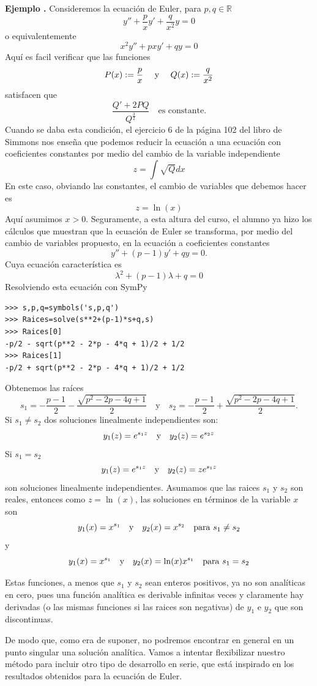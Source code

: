 \documentclass{article}
\newcommand{\rr}{\mathbb{R}}
\newcounter{ejemplo_cont}
\newenvironment{ejemplo}{\noindent\textbf{Ejemplo  \arabic{ejemplo_cont}.} }{\addtocounter{ejemplo_cont}{1}}
\begin{document}
\begin{ejemplo} Consideremos la ecuación de Euler, para $p,q\in\rr$
\[y''+\frac{p}{x}y'+\frac{q}{x^2}y=0\]
o equivalentemente
\[x^2y''+pxy'+qy=0\]
Aquí es facil verificar que las funciones
\[P(x):=\frac{p}{x}\quad\hbox{ y }\quad Q(x):= \frac{q}{x^2}\]
satisfacen que
\[\frac{Q'+2PQ}{Q^{\frac{3}{2}}}\quad\text{es constante.}\]
 Cuando se daba esta condición, el ejercicio 6 de la página 102 del libro de Simmons nos enseña que podemos reducir la ecuación a una ecuación con coeficientes constantes por medio del cambio de la variable independiente
\[z=\int\sqrt{Q}dx\]
En este caso, obviando las constantes, el cambio de variables que debemos hacer es
\[z=\ln(x)\]
Aquí  asumimos $x>0$. Seguramente, a esta altura del curso,  el alumno ya hizo los cálculos que muestran que la ecuación de Euler se transforma,  por medio del cambio de variables propuesto, en la ecuación a coeficientes constantes
\[y''+(p-1)y'+qy=0.\]
Cuya ecuación característica es
\[\lambda^2+(p-1)\lambda+q=0\]
Resolviendo esta ecuación con SymPy

\begin{lstlisting}
>>> s,p,q=symbols('s,p,q')
>>> Raices=solve(s**2+(p-1)*s+q,s)
>>> Raices[0]
-p/2 - sqrt(p**2 - 2*p - 4*q + 1)/2 + 1/2
>>> Raices[1]
-p/2 + sqrt(p**2 - 2*p - 4*q + 1)/2 + 1/2
\end{lstlisting}
Obtenemos las raíces 
\[s_1= -\frac{p-1}{2} - \frac{\sqrt{p^2 - 2p - 4q + 1}}{2}   \quad\text{y}\quad s_2=-\frac{p-1}{2} +\frac{\sqrt{p^2 - 2p - 4q + 1}}{2} .\]
 Si $s_1\neq s_2$ dos soluciones linealmente independientes son:
\[y_1(z)=e^{s_1z}\quad\hbox{y}\quad y_2(z)=e^{s_2z}\]
 Si $s_1=s_2$
\[y_1(z)=e^{s_1z} \quad\hbox{y}\quad y_2(z)=ze^{s_1z}\]
son soluciones linealmente independientes. Asumamos que las raices $s_1$ y $s_2$ son reales, entonces como $z=\ln(x)$, las soluciones en términos de la variable $x$ son 
\[y_1(x)=x^{s_1}\quad\hbox{y}\quad y_2(x)=x^{s_2}\quad\text{para }  s_1\neq s_2\]
y
\[y_1(x)=x^{s_1} \quad\hbox{y}\quad y_2(x)=\ln(x)x^{s_1}\quad\text{para }  s_1= s_2\]



Estas funciones, a menos que $s_1$ y $s_2$ sean enteros positivos, ya no son analíticas en cero, pues una función analítica es derivable infinitas veces y claramente hay derivadas (o las mismas funciones si las raices son negativas) de $y_1$ e $y_2$ que son discontinuas. 
\end{ejemplo}


De modo que, como era de suponer, no podremos encontrar en general en un punto singular una solución analítica.  Vamos a intentar flexibilizar nuestro método para incluir otro tipo de desarrollo en serie, que está inspirado en los resultados obtenidos para la ecuación de Euler. 
\end{document}
